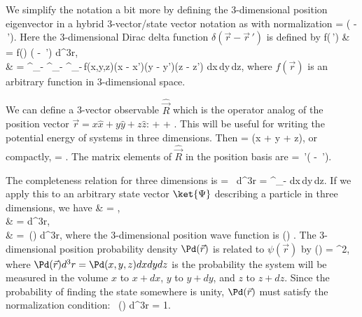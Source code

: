 We simplify the notation a bit more by defining the 3-dimensional position eigenvector in a hybrid 3-vector/state vector notation as
%
\beq
{} \equiv {}
\eeq
%
with normalization
%
\beq
{} = \delta( - \,').
\eeq
%
Here the 3-dimensional Dirac delta function $\delta(\vec{r} - \vec{r}\,')$ is defined by 
%
\bas
f(\,') & = \int  f() \delta( - \,') d^{3}r,
\nonumber \\
 & =   \int^{\infty}_{-\infty} \int^{\infty}_{-\infty} \int^{\infty}_{-\infty}\,f(x,y,z)\delta(x - x')\delta(y - y')\delta(z - z') dx\,dy\,dz,
\eas
%
where $f(\vec{r})$ is an arbitrary function in 3-dimensional space.


We can define a 3-vector observable  $\hat{\vec{R}}$ which is the operator analog of the position vector $\vec{r} = x\hat{x} + y\hat{y} + z\hat{z}$:
%
\beq
{} \equiv  {} + + .
\eeq
%
This will be useful for writing the potential energy of systems in three dimensions.  Then 
%
\beq
{} = \left(x + y + z\right),
\eeq
%
or compactly,
%
\beq
{} = .
\eeq\marginnote[-1.5cm]{\ref{tool:eigen}}%
%
The matrix elements of $\hat{\vec{R}}$ in the position basis are
%
\beq
{} = \,'\delta( - \,').
\eeq
%

The completeness relation for three dimensions is
%
\beq
 \onehat =  \int\,
d^{3}r =  \iiint\displaylimits^{\infty}_{-\infty}\,\,dx\,dy\,dz.
\label{3-D position completeness relation}
\eeq
%
If we apply this to an arbitrary state vector $\ket{\Psi}$ describing a particle in three dimensions, we have
%
\bas
\ket{\Psi} & =  \onehat\ket{\Psi}, \\
& =  \int {} d^{3}r, \\
& =   \int  \,\psi() d^{3}r,
\eas
%
where the 3-dimensional position wave function is
%
\beq
\psi() \equiv {}.
\eeq{}
%
The 3-dimensional position probability density $\Pd(\vec{r})$ is related to $\psi(\vec{r})$ by
%
\beq
\Pd() = ^{2},
\eeq
%
where $\Pd(\vec{r})d^{3}r = \Pd(x,y,z)dxdydz$ is the probability the system will be measured in the volume $x$ to $x + dx$, $y$ to $y + dy$, and $z$ to $z + dz$.  Since the probability of finding the state somewhere is unity, $\Pd(\vec{r})$ must satisfy the normalization condition:
%
\beq
\int\, \Pd() d^{3}r = 1.
\eeq

